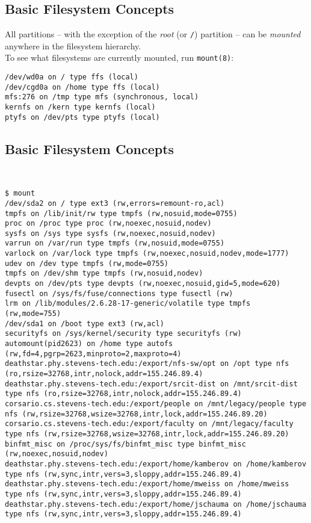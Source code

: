 \documentclass[xga]{xdvislides}
\begin{document}
\subsection{Basic Filesystem Concepts}
All partitions -- with the exception of the {\em root} (or \verb+/+) partition
-- can be {\em mounted} anywhere in the filesystem hierarchy.
\\

To see what filesystems are currently mounted, run \verb+mount(8)+:
\\

\begin{verbatim}
/dev/wd0a on / type ffs (local)
/dev/cgd0a on /home type ffs (local)
mfs:276 on /tmp type mfs (synchronous, local)
kernfs on /kern type kernfs (local)
ptyfs on /dev/pts type ptyfs (local)
\end{verbatim}


\subsection{Basic Filesystem Concepts}
\\

\small
\begin{verbatim}
$ mount
/dev/sda2 on / type ext3 (rw,errors=remount-ro,acl)
tmpfs on /lib/init/rw type tmpfs (rw,nosuid,mode=0755)
proc on /proc type proc (rw,noexec,nosuid,nodev)
sysfs on /sys type sysfs (rw,noexec,nosuid,nodev)
varrun on /var/run type tmpfs (rw,nosuid,mode=0755)
varlock on /var/lock type tmpfs (rw,noexec,nosuid,nodev,mode=1777)
udev on /dev type tmpfs (rw,mode=0755)
tmpfs on /dev/shm type tmpfs (rw,nosuid,nodev)
devpts on /dev/pts type devpts (rw,noexec,nosuid,gid=5,mode=620)
fusectl on /sys/fs/fuse/connections type fusectl (rw)
lrm on /lib/modules/2.6.28-17-generic/volatile type tmpfs (rw,mode=755)
/dev/sda1 on /boot type ext3 (rw,acl)
securityfs on /sys/kernel/security type securityfs (rw)
automount(pid2623) on /home type autofs (rw,fd=4,pgrp=2623,minproto=2,maxproto=4)
deathstar.phy.stevens-tech.edu:/export/nfs-sw/opt on /opt type nfs (ro,rsize=32768,intr,nolock,addr=155.246.89.4)
deathstar.phy.stevens-tech.edu:/export/srcit-dist on /mnt/srcit-dist type nfs (ro,rsize=32768,intr,nolock,addr=155.246.89.4)
corsario.cs.stevens-tech.edu:/export/people on /mnt/legacy/people type nfs (rw,rsize=32768,wsize=32768,intr,lock,addr=155.246.89.20)
corsario.cs.stevens-tech.edu:/export/faculty on /mnt/legacy/faculty type nfs (rw,rsize=32768,wsize=32768,intr,lock,addr=155.246.89.20)
binfmt_misc on /proc/sys/fs/binfmt_misc type binfmt_misc (rw,noexec,nosuid,nodev)
deathstar.phy.stevens-tech.edu:/export/home/kamberov on /home/kamberov type nfs (rw,sync,intr,vers=3,sloppy,addr=155.246.89.4)
deathstar.phy.stevens-tech.edu:/export/home/mweiss on /home/mweiss type nfs (rw,sync,intr,vers=3,sloppy,addr=155.246.89.4)
deathstar.phy.stevens-tech.edu:/export/home/jschauma on /home/jschauma type nfs (rw,sync,intr,vers=3,sloppy,addr=155.246.89.4)
\end{verbatim}
\Normalsize
\end{document}

